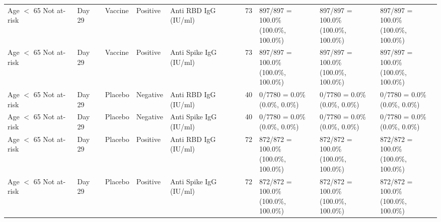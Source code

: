 \documentclass[]{book}
\theoremstyle{definition}
\theoremstyle{definition}
\theoremstyle{definition}
\newcommand{\1}{\mathbbm{1}}
\begin{document}
\begin{landscape}
\begin{ThreePartTable}
\begin{longtable}[t]{>{\raggedright\arraybackslash}p{2.7cm}llllllll}
\hspace{1em}Age $<$ 65 Not at-risk & Day 29 & Vaccine & Positive & Anti RBD IgG (IU/ml) & 73 & \makecell[l]{897/897 = 100.0\%\\(100.0\%, 100.0\%)} & \makecell[l]{897/897 = 100.0\%\\(100.0\%, 100.0\%)} & \makecell[l]{897/897 = 100.0\%\\(100.0\%, 100.0\%)}\\
\hspace{1em}Age $<$ 65 Not at-risk & Day 29 & Vaccine & Positive & Anti Spike IgG (IU/ml) & 73 & \makecell[l]{897/897 = 100.0\%\\(100.0\%, 100.0\%)} & \makecell[l]{897/897 = 100.0\%\\(100.0\%, 100.0\%)} & \makecell[l]{897/897 = 100.0\%\\(100.0\%, 100.0\%)}\\
\hspace{1em}Age $<$ 65 Not at-risk & Day 29 & Placebo & Negative & Anti RBD IgG (IU/ml) & 40 & \makecell[l]{0/7780 = 0.0\%\\(0.0\%, 0.0\%)} & \makecell[l]{0/7780 = 0.0\%\\(0.0\%, 0.0\%)} & \makecell[l]{0/7780 = 0.0\%\\(0.0\%, 0.0\%)}\\
\hspace{1em}Age $<$ 65 Not at-risk & Day 29 & Placebo & Negative & Anti Spike IgG (IU/ml) & 40 & \makecell[l]{0/7780 = 0.0\%\\(0.0\%, 0.0\%)} & \makecell[l]{0/7780 = 0.0\%\\(0.0\%, 0.0\%)} & \makecell[l]{0/7780 = 0.0\%\\(0.0\%, 0.0\%)}\\
\hspace{1em}Age $<$ 65 Not at-risk & Day 29 & Placebo & Positive & Anti RBD IgG (IU/ml) & 72 & \makecell[l]{872/872 = 100.0\%\\(100.0\%, 100.0\%)} & \makecell[l]{872/872 = 100.0\%\\(100.0\%, 100.0\%)} & \makecell[l]{872/872 = 100.0\%\\(100.0\%, 100.0\%)}\\
\hspace{1em}Age $<$ 65 Not at-risk & Day 29 & Placebo & Positive & Anti Spike IgG (IU/ml) & 72 & \makecell[l]{872/872 = 100.0\%\\(100.0\%, 100.0\%)} & \makecell[l]{872/872 = 100.0\%\\(100.0\%, 100.0\%)} & \makecell[l]{872/872 = 100.0\%\\(100.0\%, 100.0\%)}\\

\end{longtable}
\end{ThreePartTable}
\end{landscape}
\end{document}
